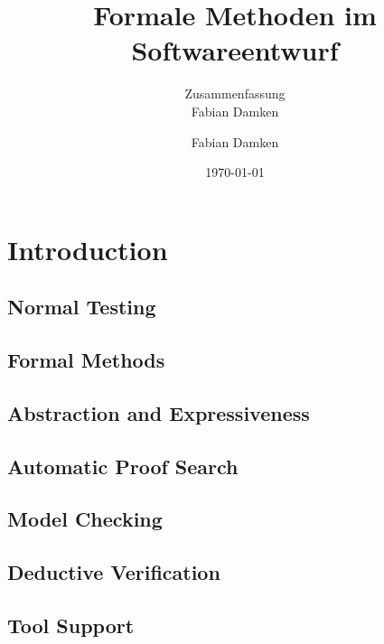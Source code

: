 \documentclass[a4paper, 11pt, accentcolor = tud3b]{tudreport}
\title{Formale Methoden im Softwareentwurf}
\subtitle{Zusammenfassung \\ Fabian Damken}
\author{Fabian Damken}
\date{\today}
\begin{document}
    \maketitle
    \tableofcontents
    \listoftodos

    \chapter{Introduction} %

        \section{Normal Testing} %

        \section{Formal Methods} %

        \section{Abstraction and Expressiveness} %

        \section{Automatic Proof Search} %

        \section{Model Checking} %

        \section{Deductive Verification} %

        \section{Tool Support} %
\end{document}

